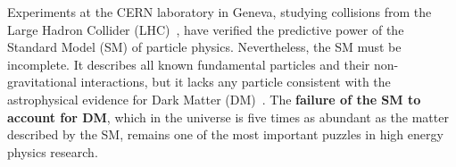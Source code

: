 Experiments at the CERN laboratory in Geneva, studying collisions from the Large Hadron Collider (LHC)~\cite{LHC2008}, have verified the predictive power of the Standard Model (SM) of particle physics. %
Nevertheless, the SM must be incomplete.
It describes all known fundamental particles and their non-gravitational interactions,
but it lacks any particle consistent with the astrophysical evidence for Dark Matter (DM)~\cite{Bertone:2016nfn}.
The \textbf{failure of the SM to account for DM}, which in the universe is five times as abundant as the matter described by the SM, remains one of the most important puzzles in high energy physics research.


